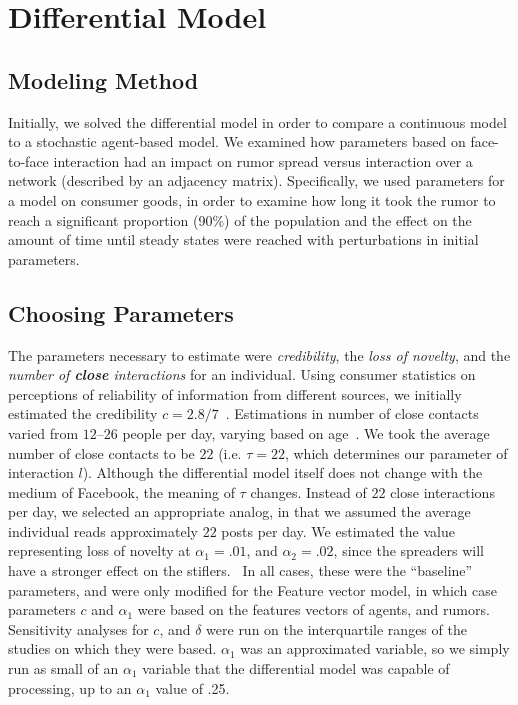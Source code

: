 \section{Differential Model }
\label{sec:diffmodel}

\subsection{Modeling Method}
\label{subsec:diffmodeapp}

Initially, we solved the differential model in order to compare a continuous model to a stochastic agent-based model.
We examined how parameters based on face-to-face interaction had an impact on rumor spread versus interaction over a network (described by an adjacency matrix).
Specifically, we used parameters for a model on consumer goods, in order to examine how long it took the rumor to reach a significant proportion (90\%) of the population and the effect on the amount of time until steady states were reached with perturbations in initial parameters.

\subsection{Choosing Parameters}
\label{subsec:diffmodeeparam}

The parameters necessary to estimate were \textit{credibility}, the
\textit{loss of novelty}, and the \textit{number of \textbf{close} interactions} for an individual.
Using consumer statistics on perceptions of reliability of information from different sources, we initially estimated the credibility $ c = 2.8/7 $~\cite{kamins-1997}.
Estimations in number of close contacts varied from $ 12 $--$ 26 $ people per day, varying based on age~\cite{cahill-1996, mossong-2008, edmunds-2006}.
We took the average number of close contacts to be $ 22 $ (i.e. $ \tau = 22 $, which determines our parameter of interaction $ l $).
Although the differential model itself does not change with the medium of Facebook, the meaning of $ \tau $ changes.
Instead of $ 22 $ close interactions per day, we selected an appropriate analog, in that we assumed the average individual reads approximately $ 22 $ posts per day.
We estimated the value representing loss of novelty at $ \alpha_1 = .01 $, and $ \alpha_2 = .02 $, since the spreaders will have a stronger effect on the stiflers.
\
In all cases, these were the ``baseline'' parameters, and were only modified for the Feature vector model, in which case parameters $ c $ and $ \alpha_1 $ were based on the features vectors of agents, and rumors.
Sensitivity analyses for $ c $, and $ \delta $ were run on the interquartile ranges of the studies on which they were based.
$ \alpha_1 $ was an approximated variable, so we simply run as small of an $ \alpha_1 $ variable that the differential model was capable of processing, up to an $ \alpha_1 $ value of .25.
